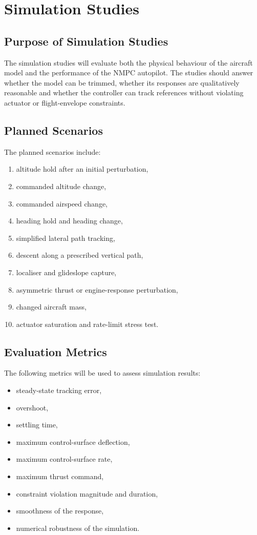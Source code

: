 \chapter{Simulation Studies}

\section{Purpose of Simulation Studies}

The simulation studies will evaluate both the physical behaviour of the aircraft model and the performance of the NMPC autopilot. The studies should answer whether the model can be trimmed, whether its responses are qualitatively reasonable and whether the controller can track references without violating actuator or flight-envelope constraints.

\section{Planned Scenarios}

The planned scenarios include:
\begin{enumerate}
    \item altitude hold after an initial perturbation,
    \item commanded altitude change,
    \item commanded airspeed change,
    \item heading hold and heading change,
    \item simplified lateral path tracking,
    \item descent along a prescribed vertical path,
    \item localiser and glideslope capture,
    \item asymmetric thrust or engine-response perturbation,
    \item changed aircraft mass,
    \item actuator saturation and rate-limit stress test.
\end{enumerate}

\section{Evaluation Metrics}

The following metrics will be used to assess simulation results:
\begin{itemize}
    \item steady-state tracking error,
    \item overshoot,
    \item settling time,
    \item maximum control-surface deflection,
    \item maximum control-surface rate,
    \item maximum thrust command,
    \item constraint violation magnitude and duration,
    \item smoothness of the response,
    \item numerical robustness of the simulation.
\end{itemize}
